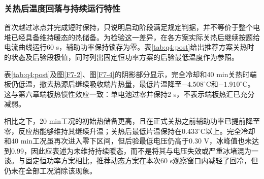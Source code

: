 \documentclass[bwprint]{gmcmthesis}
\numberwithin{equation}{section}
\numberwithin{figure}{section}
\begin{document}
\subsubsection{关热后温度回落与持续运行特性}

首次越过冰点并完成短时保持，只说明启动阶段满足规定判据，并不等价于整个电堆已经具备维持暖态的热储备。为检验这一差异，在各方案实际关热后继续按题给电流曲线运行60 s，辅助功率保持锁存为零。表\ref{tab:q4:post}给出推荐方案关热时的状态及后验段极值，同时列出固定恒功率方案的后验最低温度作为参照。

\begin{table}[htbp]
    \centering
    \caption{推荐动态策略关热状态及关热后60 s的运行结果}
    \vspace{0.3cm}
    \label{tab:q4:post}
    \renewcommand{\arraystretch}{1.5}
\end{table}

表\ref{tab:q4:post}及图\ref{F7-2}、图\ref{F7-4}的阴影部分显示，完全冷却和40 min关热时端板仍低温，撤去热源后继续吸收端片热量，最低片温降至\(-4.508^\circ\mathrm C\)和\(-1.910^\circ\mathrm C\)。这与第六章端板热惯性效应一致：单电池过零并保持2 s，不表示端板热汇已充分减弱。

相比之下，20 min工况的初始热储备更高，且在正式关热之前辅助功率已提前降至零，反应热能够维持其继续升温；关热后最低片温保持在0.433\(^\circ\mathrm C\)以上。完全冷却和40 min工况虽再次进入零下区间，但后验最低电压仍高于0.30 V，冰峰值也未达到0.99，因此应表述为未维持持续暖态，而不是将其与电压失效或严重冰堵混为一谈。与固定恒功率方案相比，推荐动态方案在本次60 s观察窗口内减轻了回冷，但仍未在全部工况消除该现象。
\end{document}

